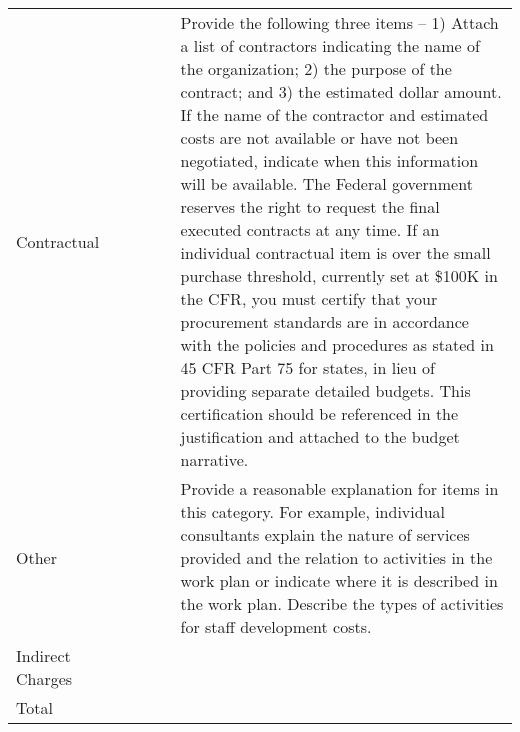 \begin{table}[]
{\begin{tabular}{@{}lllllp{8cm}@{}}
Contractual &  &  &  &  & Provide the following three items – 1) Attach a list of contractors indicating the name of the organization; 2) the purpose of the contract; and 3) the estimated dollar amount. If the name of the contractor and estimated costs are not available or have not been negotiated, indicate when this information will be available. The Federal government reserves the right to request the final executed contracts at any time. If an individual contractual item is over the small purchase threshold, currently set at \$100K in the CFR, you must certify that your procurement standards are in accordance with the policies and procedures as stated in 45 CFR Part 75 for states, in lieu of providing separate detailed budgets. This certification should be referenced in the justification and attached to the budget narrative. \\
Other &  &  &  &  & Provide a reasonable explanation for items in this category. For example, individual consultants explain the nature of services provided and the relation to activities in the work plan or indicate where it is described in the work plan. Describe the types of activities for staff development costs. \\
Indirect Charges &  &  &  &  &  \\
Total &  &  &  &  &  \\
\end{tabular}%
}
\end{table}
